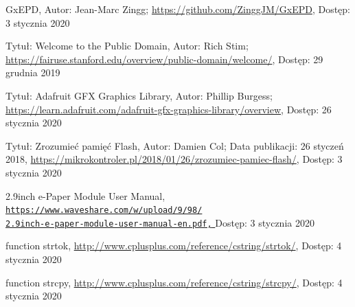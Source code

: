 \documentclass[a4paper,12pt, twoside]{article}
\begin{document}
\begin{thebibliography}{}
    		GxEPD,\newline
    		Autor: Jean-Marc Zingg;
    		\newline\url{https://github.com/ZinggJM/GxEPD}, 
    		\newline Dostęp: 3 stycznia 2020
    		
    		Tytuł: Welcome to the Public Domain, \newline
    		Autor: Rich Stim; \newline
    		\newline\url{https://fairuse.stanford.edu/overview/public-domain/welcome/}, 
    		\newline Dostęp: 29 grudnia 2019
    		
    		Tytuł: Adafruit GFX Graphics Library, \newline
    		Autor: Phillip Burgess; \newline
    		\newline\url{https://learn.adafruit.com/adafruit-gfx-graphics-library/overview}, 
    		\newline Dostęp: 26 stycznia 2020
    		
    		Tytuł: Zrozumieć pamięć Flash,\newline
    		Autor: Damien Col; \newline
    		Data publikacji: 26 styczeń 2018,
    		\newline\url{https://mikrokontroler.pl/2018/01/26/zrozumiec-pamiec-flash/}, 
    		\newline Dostęp: 3 stycznia 2020
    		
    		2.9inch e-Paper Module User Manual,
    		\newline\href{https://www.waveshare.com/w/upload/9/98/2.9inch-e-paper-module-user-manual-en.pdf}
    		 {\nolinkurl{https://www.waveshare.com/w/upload/9/98/}
                 \\
                  \nolinkurl{2.9inch-e-paper-module-user-manual-en.pdf,}
                 }
    		\newline Dostęp: 3 stycznia 2020
    		
    		function strtok,
    		\newline\url{http://www.cplusplus.com/reference/cstring/strtok/}, 
    		\newline Dostęp: 4 stycznia 2020
    		
    		function strcpy,
    		\newline\url{http://www.cplusplus.com/reference/cstring/strcpy/}, 
    		\newline Dostęp: 4 stycznia 2020
    		

\end{thebibliography}
\end{document}
